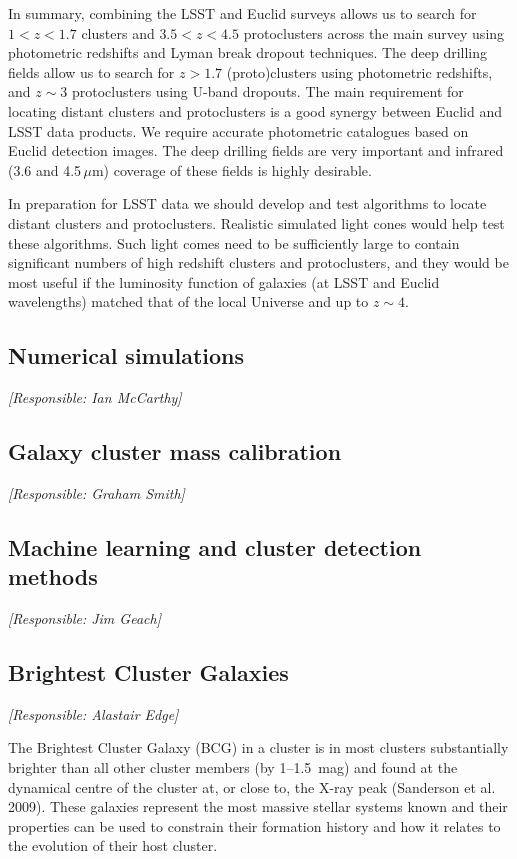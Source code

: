 \documentclass[a4paper,11pt]{article}
\begin{document}
In summary, combining the LSST and Euclid surveys allows us to search for $1<z<1.7$ clusters and $3.5<z<4.5$ protoclusters across the main survey using photometric redshifts and Lyman break dropout techniques. The deep drilling fields allow us to search for $z>1.7$ (proto)clusters using photometric redshifts, and $z\sim3$ protoclusters using U-band dropouts. The main requirement for locating distant clusters and protoclusters is a good synergy between Euclid and LSST data products. We require accurate photometric catalogues based on Euclid detection images. The deep drilling fields are very important and infrared (3.6 and 4.5\,$\mu$m) coverage of these fields is highly desirable.

In preparation for LSST data we should develop and test algorithms to locate distant clusters and protoclusters. Realistic simulated light cones would help test these algorithms. Such light comes need to be sufficiently large to contain significant numbers of high redshift clusters and protoclusters, and they would be most useful if the luminosity function of galaxies (at LSST and Euclid wavelengths) matched that of the local Universe and up to $z\sim4$.

\subsection{Numerical simulations}

{\it [Responsible: Ian McCarthy]}

\subsection{Galaxy cluster mass calibration}

{\it [Responsible: Graham Smith]}

\subsection{Machine learning and cluster detection methods}

{\it [Responsible: Jim Geach]}

\subsection{Brightest Cluster Galaxies}

{\it [Responsible: Alastair Edge]}

The Brightest Cluster Galaxy (BCG) in a cluster is in most
clusters substantially brighter than all other cluster
members (by 1--1.5~mag) and found at the dynamical centre
of the cluster at, or close to, the X-ray peak (Sanderson
et al. 2009). These galaxies represent the most massive 
stellar systems known and their properties can be used
to constrain their formation history and how it relates
to the evolution of their host cluster.
\end{document}
